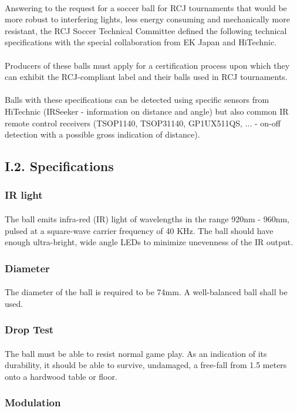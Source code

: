 \documentclass{article}
\newcommand*{\p}{\paragraph{}}
\begin{document}
\p Answering to the request for a soccer ball for RCJ tournaments that would be
more robust to interfering lights, less energy consuming and mechanically more
resistant, the RCJ Soccer Technical Committee defined the following technical
specifications with the special collaboration from EK Japan and HiTechnic.

\p Producers of these balls must apply for a certification process upon which they
can exhibit the RCJ-compliant label and their balls used in RCJ tournaments.

\p Balls with these specifications can be detected using specific sensors from
HiTechnic (IRSeeker - information on distance and angle) but also common IR
remote control receivers (TSOP1140, TSOP31140, GP1UX511QS, ... - on-off
detection with a possible gross indication of distance).

\subsection{I.2. Specifications}

\subsubsection{IR light}

\p The ball emits infra-red (IR) light of wavelengths in the range 920nm - 960nm,
pulsed at a square-wave carrier frequency of 40 KHz. The ball should have
enough ultra-bright, wide angle LEDs to minimize unevenness of the IR output.

\subsubsection{Diameter}

\p The diameter of the ball is required to be 74mm. A well-balanced ball shall be
used.

\subsubsection{Drop Test}

\p The ball must be able to resist normal game play. As an indication of its
durability, it should be able to survive, undamaged, a free-fall from 1.5
meters onto a hardwood table or floor.

\subsubsection{Modulation}
\end{document}
